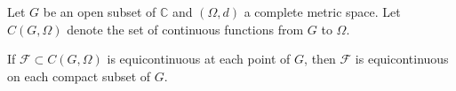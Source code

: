 Let \(G\) be an open subset of \(\mathbb{C}\) and \((\Omega, d)\) a complete metric space. Let \(C(G, \Omega)\) denote the set of continuous functions from \(G\) to \(\Omega\).

If \(\mathcal{F} \subset C(G, \Omega)\) is equicontinuous at each point of \(G\), then \(\mathcal{F}\) is equicontinuous on each compact subset of \(G\).
